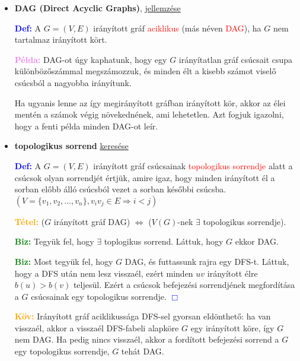 \documentclass[../../szobeli.tex]{subfiles}
\begin{document}
\begin{center}
    \noindent{}
\end{center}

    \begin{itemize}
        \item \textbf{DAG (Direct Acyclic Graphs)}, \underline{jellemzése}

            \textcolor{blue}{\textbf{Def:}} A $G = (V,E)$ irányított gráf \textcolor{red}{aciklikus} (más néven \textcolor{red}{DAG}), ha $G$ nem tartalmaz irányított kört.

            \textcolor{violet}{\textbf{Példa:}} DAG-ot úgy kaphatunk, hogy egy $G$ irányítatlan gráf csúcsait csupa különbözőszámmal megszámozzuk, és minden élt a kisebb számot viselő csúcsból a nagyobba irányítunk.

            Ha ugyanis lenne az így megirányított gráfban irányított kör, akkor az élei mentén a számok végig növekednének, ami lehetetlen. Azt fogjuk igazolni, hogy a fenti példa minden DAG-ot leír.

        \item \textbf{topologikus sorrend} \underline{keresése}
        
            \textcolor{blue}{\textbf{Def:}} A $G = (V,E)$ irányított gráf csúcsainak \textcolor{red}{topologikus sorrendje} alatt a csúcsok olyan sorrendjét értjük, amire igaz, hogy minden irányított él a sorban előbb álló csúcsból vezet a sorban későbbi csúcsba. $(V=\{v_1,v_2,\dots,v_n\},v_iv_j \in E \Rightarrow i < j)$
        
            \textcolor{orange}{\textbf{Tétel:}} ($G$ irányított gráf DAG) $\Leftrightarrow$ ($V(G)$-nek $\exists$ topologikus sorrendje).

            \textcolor{green}{\textbf{Biz:}} Tegyük fel, hogy $\exists$ toplogikus sorrend. Láttuk, hogy $G$ ekkor DAG. \checkmark

            \textcolor{green}{\textbf{Biz:}} Most tegyük fel, hogy $G$ DAG, és futtassunk rajra egy DFS-t. Láttuk, hogy a DFS után nem lesz visszaél, ezért minden $uv$ irányított élre $b(u) > b(v)$ teljesül. Ezért a csúcsok befejezési sorrendjének megfordítása a $G$ csúcsainak egy topologikus sorrendje.  \textcolor{blue}{$\Box$} 

            \textcolor{orange}{\textbf{Köv:}} Irányított gráf aciklikussága DFS-sel gyorsan eldönthető: ha van visszaél, akkor a visszaél DFS-fabeli alapköre $G$ egy irányított köre, így $G$ nem DAG. Ha pedig nincs visszaél, akkor a fordított befejezési sorrend a $G$ egy topologikus sorrendje, $G$ tehát DAG.


\end{itemize}
\end{document}
